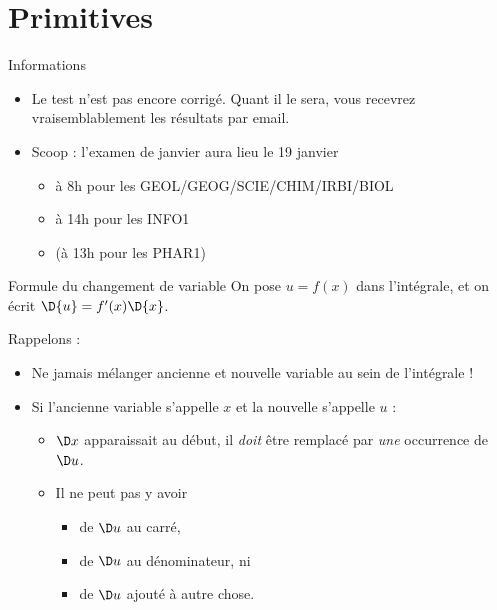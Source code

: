 \section{Primitives}
\begin{frame}{Informations}
  \begin{itemize}
  \item Le test n'est pas encore corrigé. Quant il le sera, vous recevrez vraisemblablement les résultats par email.\pause{}
  \item Scoop : l'examen de janvier aura lieu le 19 janvier
    \begin{itemize}\pause{}
    \item à 8h pour les GEOL/GEOG/SCIE/CHIM/IRBI/BIOL\pause{}
    \item à 14h pour les INFO1\pause{}
    \item (à 13h pour les PHAR1)
    \end{itemize}
  \end{itemize}
\end{frame}
\begin{frame}{Formule du changement de variable}
  On pose \(u = f(x)\) dans l'intégrale\pause{}, et on écrit \(\D{u} = f'(x) \D{x}\).\pause{}
  \begin{remark}Rappelons :\pause{}
    \begin{itemize}
    \item Ne jamais mélanger ancienne et nouvelle variable au sein de l'intégrale !\pause{}
    \item Si l'ancienne variable s'appelle \(x\) et la nouvelle s'appelle \(u\) :
      \begin{itemize}\pause{}
      \item \(\D x\) apparaissait au début, il \emph{doit} être remplacé par \emph{une} occurrence de \(\D u\).\pause{}
      \item Il ne peut pas y avoir
        \begin{itemize}
        \item de \(\D u\) au carré,\pause{}
        \item de \(\D u\) au dénominateur,\pause{} ni
        \item de \og \(\D u\) ajouté à autre chose\fg{}.
        \end{itemize}
      \end{itemize}
    \end{itemize}
  \end{remark}
\end{frame}

